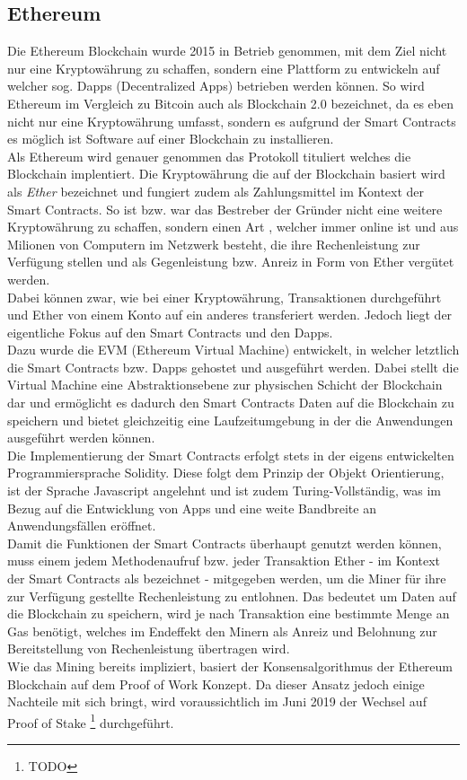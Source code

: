 \subsection{Ethereum}
Die Ethereum Blockchain wurde 2015 in Betrieb genommen, mit dem Ziel nicht nur eine Kryptowährung zu schaffen, sondern eine Plattform zu entwickeln auf welcher sog. Dapps (Decentralized Apps) betrieben werden können.
So wird Ethereum im Vergleich zu Bitcoin auch als Blockchain 2.0 bezeichnet, da es eben nicht nur eine Kryptowährung umfasst, sondern es aufgrund der Smart Contracts es möglich ist Software auf einer Blockchain zu installieren. \\
Als Ethereum wird genauer genommen das Protokoll tituliert welches die Blockchain implentiert. Die Kryptowährung die auf der Blockchain basiert wird als \textit{Ether} bezeichnet und fungiert zudem als Zahlungsmittel im Kontext der Smart Contracts. So ist bzw. war das Bestreber der Gründer nicht eine weitere Kryptowährung zu schaffen, sondern einen Art , welcher immer online ist und aus Milionen von Computern im Netzwerk besteht, die ihre Rechenleistung zur Verfügung stellen und als Gegenleistung bzw. Anreiz in Form von Ether vergütet werden. \\
Dabei können zwar, wie bei einer Kryptowährung, Transaktionen durchgeführt und Ether von einem Konto auf ein anderes transferiert werden. Jedoch liegt der eigentliche Fokus auf den Smart Contracts und den Dapps.\\
Dazu wurde die EVM (Ethereum Virtual Machine) entwickelt, in welcher letztlich die Smart Contracts bzw. Dapps gehostet und ausgeführt werden. Dabei stellt die Virtual Machine eine Abstraktionsebene zur physischen Schicht der Blockchain dar und ermöglicht es dadurch den Smart Contracts Daten auf die Blockchain zu speichern und bietet gleichzeitig eine Laufzeitumgebung in der die Anwendungen ausgeführt werden können.\\
Die Implementierung der Smart Contracts erfolgt stets in der eigens entwickelten Programmiersprache Solidity. Diese folgt dem Prinzip der Objekt Orientierung, ist der Sprache Javascript angelehnt und ist zudem Turing-Vollständig, was im Bezug auf die Entwicklung von Apps und eine weite Bandbreite an Anwendungsfällen eröffnet. \\
Damit die Funktionen der Smart Contracts überhaupt genutzt werden können, muss einem jedem Methodenaufruf bzw. jeder Transaktion Ether - im Kontext der Smart Contracts als  bezeichnet - mitgegeben werden, um die Miner für ihre zur Verfügung gestellte Rechenleistung zu entlohnen. Das bedeutet um Daten auf die Blockchain zu speichern, wird je nach Transaktion eine bestimmte Menge an Gas benötigt, welches im Endeffekt den Minern als Anreiz und Belohnung zur Bereitstellung von Rechenleistung übertragen wird. \\
Wie das Mining bereits impliziert, basiert der Konsensalgorithmus der Ethereum Blockchain auf dem Proof of Work Konzept. Da dieser Ansatz jedoch einige Nachteile mit sich bringt, wird voraussichtlich im Juni 2019 der Wechsel auf Proof of Stake \footnote{TODO} durchgeführt. 



